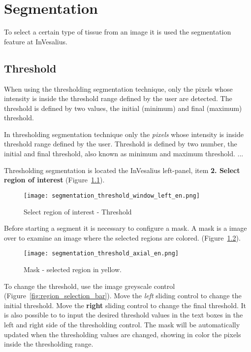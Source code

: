 \chapter{Segmentation}

To select a certain type of tissue from an image it is used the segmentation feature at InVesalius.

\section{Threshold}

When using the thresholding segmentation technique, only the pixels whose intensity is inside the threshold range defined by the user are detected. The threshold is defined by two values, the initial (minimum) and final (maximum) threshold.

In thresholding segmentation technique only the \textit{pixels} whose intensity is inside threshold range defined by the user. Threshold is defined by two number, the initial and final threshold, also known as minimum and maximum threshold. ...

Thresholding segmentation is located the InVesalius left-panel, item \textbf{2. Select region of interest} (Figure~\ref{fig:region_selection}).

\begin{figure}[!htb]
\centering
\texttt{[image: segmentation\_threshold\_window\_left\_en.png]}
\caption{Select region of interest - Threshold}
\label{fig:region_selection}
\end{figure}

Before starting a segment it is necessary to configure a mask. A mask is a image over to examine an image where the selected regions are colored. (Figure~\ref{fig:region_selection_masc}).

\begin{figure}[!htb]
\centering
\texttt{[image: segmentation\_threshold\_axial\_en.png]}
\caption{Mask - selected region in yellow.}
\label{fig:region_selection_masc}
\end{figure}

To change the threshold, use the image greyscale control (Figure~\ref{fig:region_selection_bar}). Move the \textit{left} sliding control to change the initial threshold. Move the \textbf{right} sliding control to change the final threshold. It is also possible to to input the desired threshold values in the text boxes in
the left and right side of the thresholding control. The mask will be automatically updated when the thresholding values are changed, showing in color the pixels inside the thresholding range.


